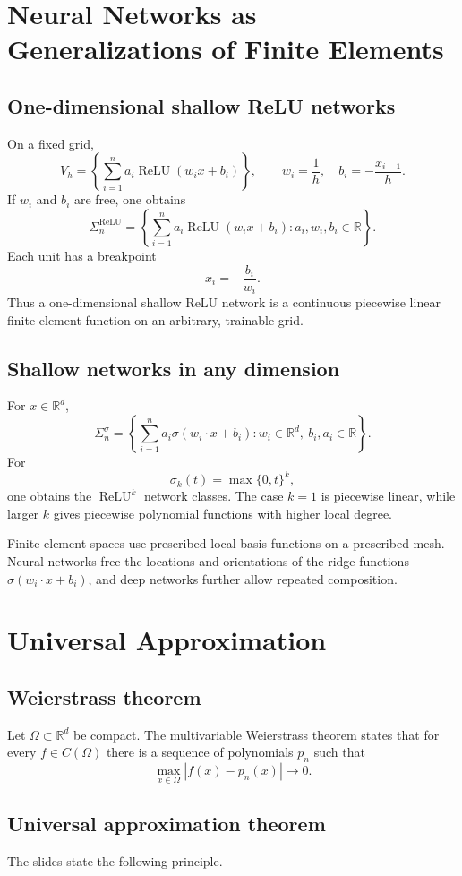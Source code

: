 \documentclass[11pt,a4paper]{article}
\newcommand{\R}{\mathbb{R}}
\newcommand{\ReLU}{\operatorname{ReLU}}
\newcommand{\Vh}{V_h}
\theoremstyle{definition}
\theoremstyle{plain}
\theoremstyle{remark}
\newcommand{\boxnote}[1]{%
  \vspace{0.5em}
  \noindent\colorbox{softblue}{\parbox{0.965\linewidth}{#1}}
  \vspace{0.5em}
}
\begin{document}
\section{Neural Networks as Generalizations of Finite Elements}

\subsection{One-dimensional shallow ReLU networks}
On a fixed grid,
\[
  \Vh=\left\{\sum_{i=1}^n a_i\ReLU(w_ix+b_i)\right\},
  \qquad
  w_i=\frac1h,
  \quad b_i=-\frac{x_{i-1}}h.
\]
If $w_i$ and $b_i$ are free, one obtains
\[
  \Sigma_n^{\ReLU}
  =\left\{
  \sum_{i=1}^n a_i\ReLU(w_ix+b_i):
  a_i,w_i,b_i\in\R
  \right\}.
\]
Each unit has a breakpoint
\[
  x_i=-\frac{b_i}{w_i}.
\]
Thus a one-dimensional shallow ReLU network is a continuous piecewise linear finite element function on an arbitrary, trainable grid.

\subsection{Shallow networks in any dimension}
For $x\in\R^d$,
\[
  \Sigma_n^\sigma
  =\left\{
  \sum_{i=1}^n a_i\sigma(w_i\cdot x+b_i):
  w_i\in\R^d,\ b_i,a_i\in\R
  \right\}.
\]
For
\[
  \sigma_k(t)=\max\{0,t\}^k,
\]
one obtains the $\ReLU^k$ network classes. The case $k=1$ is piecewise linear, while larger $k$ gives piecewise polynomial functions with higher local degree.

\boxnote{Finite element spaces use prescribed local basis functions on a prescribed mesh. Neural networks free the locations and orientations of the ridge functions $\sigma(w_i\cdot x+b_i)$, and deep networks further allow repeated composition.}

\section{Universal Approximation}

\subsection{Weierstrass theorem}
Let $\Omega\subset\R^d$ be compact. The multivariable Weierstrass theorem states that for every $f\in C(\Omega)$ there is a sequence of polynomials $p_n$ such that
\[
  \max_{x\in\Omega}|f(x)-p_n(x)|\longrightarrow0.
\]

\subsection{Universal approximation theorem}
The slides state the following principle.
\end{document}
